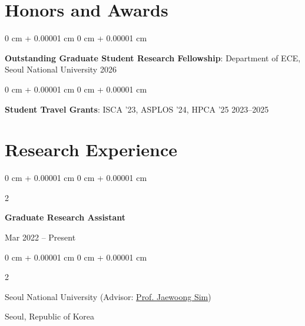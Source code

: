\documentclass[10pt, letterpaper]{article}
\newenvironment{onecolentry}{
  \begin{adjustwidth}{
    0 cm + 0.00001 cm
  }{
    0 cm + 0.00001 cm
  }
}{
  \end{adjustwidth}
} %
\newenvironment{twocolentry}[2][]{
  \onecolentry
  \def\secondColumn{#2}
  \setcolumnwidth{\fill, 6 cm}
  \begin{paracol}{2}
}{
  \switchcolumn \raggedleft \secondColumn
  \end{paracol}
  \endonecolentry
} %
\let\hrefWithoutArrow\href
\begin{document}
  \section{Honors and Awards}
    \begin{onecolentry}
      \textbf{Outstanding Graduate Student Research Fellowship}: Department of ECE, Seoul National University \hfill 2026
    \end{onecolentry}
    \vspace{0.15 cm}
    \begin{onecolentry}
      \textbf{Student Travel Grants}: ISCA '23, ASPLOS '24, HPCA '25 \hfill 2023--2025
    \end{onecolentry}

  \clearpage
  \fontsize{10.5}{13}\selectfont
  \section{Research Experience}
    \begin{twocolentry}{
      Mar 2022 – Present
    }
      \textbf{Graduate Research Assistant}
    \end{twocolentry}
%
    \begin{twocolentry}{
      Seoul, Republic of Korea
    }
      Seoul National University (Advisor: \hrefWithoutArrow{https://jaewoong.org}{Prof. Jaewoong Sim})
    \end{twocolentry}
\end{document}
